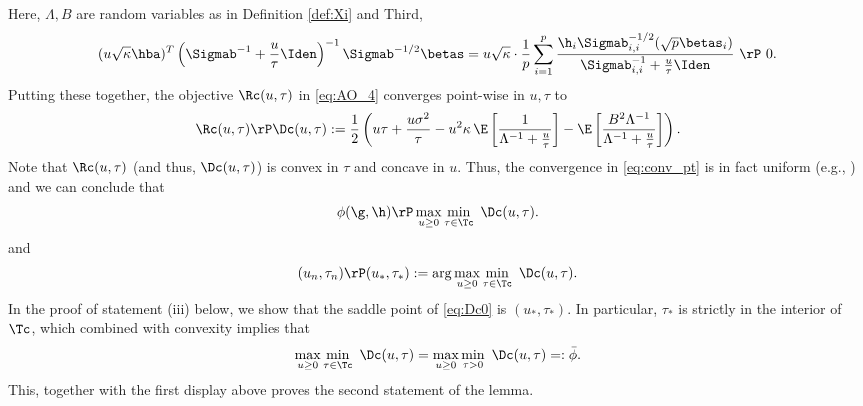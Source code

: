 Here, $\Lambda,B$ are random variables as in Definition \ref{def:Xi} and 
Third, 
\begin{align}
(u\sqrt{\kappa}\hba)^T\left(\Sigmab^{-1}+\frac{u}{\tau}\Iden\right)^{-1}\Sigmab^{-1/2}\betas = u\sqrt{\kappa} \cdot \frac{1}{p}\sum_{i=1}
^p \frac{\h_i\Sigmab_{i,i}^{-1/2}(\sqrt{p}\betas_i)}{\Sigmab_{i,i}^{-1}+\frac{u}{\tau}\Iden} ~\rP~ 0.
\end{align}
Putting these together, the objective $\Rc(u,\tau)$ in \eqref{eq:AO_4} converges point-wise in $u,\tau$ to
\begin{align}
\Rc(u,\tau)\rP\Dc(u,\tau) := \frac{1}{2}\left({u\tau} + \frac{u\sigma^2}{\tau} - u^2\kappa\,\E\left[ \frac{1}{\Lambda^{-1}+\frac{u}{\tau}} \right] - \E\left[\frac{B^2\Lambda^{-1}}{\Lambda^{-1}+\frac{u}{\tau}}\right] \right).\label{eq:conv_pt}
\end{align}
Note that $\Rc(u,\tau)$ (and thus, $\Dc(u,\tau)$) is convex in $\tau$ and concave in $u$. Thus, the convergence in \eqref{eq:conv_pt} is in fact uniform (e.g., \cite{AG1982}) and we can conclude that 
\begin{align}\label{eq:Dc0}
\phi(\g,\h) \rP \max_{u\geq 0}\min_{\tau\in\Tc}~ \Dc(u,\tau).
\end{align}
and
\begin{align}\label{eq:Dc}
(u_n,\tau_n) \rP (u_*,\tau_*):=\arg\max_{u\geq 0}\min_{\tau\in\Tc}~ \Dc(u,\tau).
\end{align}
In the proof of statement (iii) below, we show that the saddle point of \eqref{eq:Dc0} is $(u_*,\tau_*)$. In particular, $\tau_*$ is strictly in the interior of $\Tc$, which combined with convexity implies that
$$
 \max_{u\geq 0}\min_{\tau\in\Tc}~ \Dc(u,\tau) =  \max_{u\geq 0}\min_{\tau>0}~ \Dc(u,\tau) =: \bar\phi.
$$
This, together with the first display above proves the second statement of the lemma.

\vspace{5pt}

